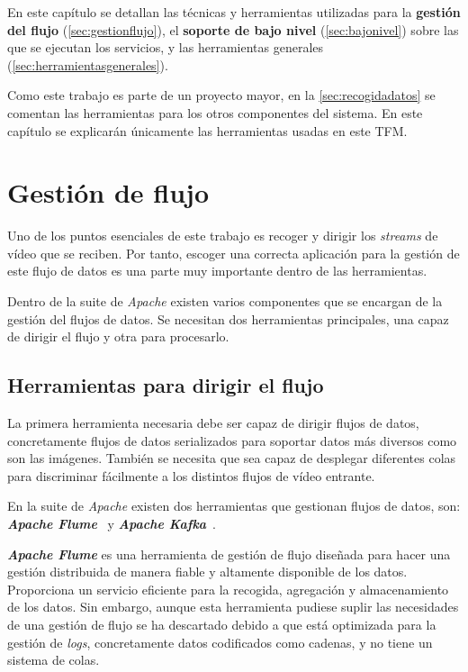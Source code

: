 
En este capítulo se detallan las técnicas y herramientas utilizadas para la \textbf{gestión del flujo} (\autoref{sec:gestionflujo}), el \textbf{soporte de bajo nivel} (\autoref{sec:bajonivel}) sobre las que se ejecutan los servicios, y las herramientas generales (\autoref{sec:herramientasgenerales}).

Como este trabajo es parte de un proyecto mayor, en la \autoref{sec:recogidadatos} se comentan las herramientas para los otros componentes del sistema. En este capítulo se explicarán únicamente las herramientas usadas en este TFM.

\section{Gestión de flujo}\label{sec:gestionflujo}

Uno de los puntos  esenciales de este trabajo es recoger y dirigir los \textit{streams} de vídeo que se reciben. Por tanto, escoger una correcta aplicación para la gestión de este flujo de datos es una parte muy importante dentro de las herramientas.

Dentro de la suite de \textit{Apache} existen varios componentes que se encargan de la gestión del flujos de datos. Se necesitan dos herramientas principales, una capaz de dirigir el flujo y otra para procesarlo.

\subsection{Herramientas para dirigir el flujo}
La primera herramienta necesaria debe ser capaz de dirigir flujos de datos, concretamente flujos de datos serializados para soportar datos más diversos como son las imágenes. También se necesita que sea capaz de desplegar diferentes colas para discriminar fácilmente a los distintos flujos de vídeo entrante.

En la suite de \textit{Apache} existen dos herramientas que gestionan flujos de datos, son: \textit{\textbf{Apache Flume}}~\cite{noauthorapacheflume} y \textit{\textbf{Apache Kafka}}~\cite{noauthorapachenodate}.

\textit{\textbf{Apache Flume}} es una herramienta de gestión de flujo diseñada para hacer una gestión distribuida de manera fiable y altamente disponible de los datos. Proporciona un servicio eficiente para la recogida, agregación y almacenamiento de los datos. Sin embargo, aunque esta herramienta pudiese suplir las necesidades de una gestión de flujo se ha descartado debido a que está optimizada para la gestión de \textit{logs}, concretamente datos codificados como cadenas, y no tiene un sistema de colas.

